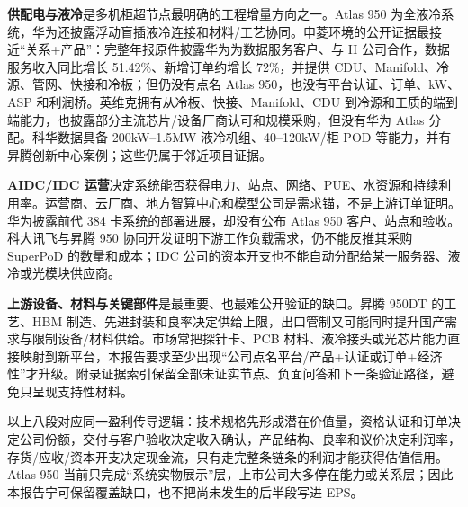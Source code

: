 \textbf{供配电与液冷}是多机柜超节点最明确的工程增量方向之一。Atlas 950 为全液冷系统，华为还披露浮动盲插液冷连接和材料/工艺协同。申菱环境的公开证据最接近“关系+产品”：完整年报原件披露华为为数据服务客户、与 H 公司合作，数据服务收入同比增长 51.42\%、新增订单约增长 72\%，并提供 CDU、Manifold、冷源、管网、快接和冷板；但仍没有点名 Atlas 950，也没有平台认证、订单、kW、ASP 和利润桥。英维克拥有从冷板、快接、Manifold、CDU 到冷源和工质的端到端能力，也披露部分主流芯片/设备厂商认可和规模采购，但没有华为 Atlas 分配。科华数据具备 200kW--1.5MW 液冷机组、40--120kW/柜 POD 等能力，并有昇腾创新中心案例；这些仍属于邻近项目证据。

\textbf{AIDC/IDC 运营}决定系统能否获得电力、站点、网络、PUE、水资源和持续利用率。运营商、云厂商、地方智算中心和模型公司是需求锚，不是上游订单证明。华为披露前代 384 卡系统的部署进展，却没有公布 Atlas 950 客户、站点和验收。科大讯飞与昇腾 950 协同开发证明下游工作负载需求，仍不能反推其采购 SuperPoD 的数量和成本；IDC 公司的资本开支也不能自动分配给某一服务器、液冷或光模块供应商。

\textbf{上游设备、材料与关键部件}是最重要、也最难公开验证的缺口。昇腾 950DT 的工艺、HBM 制造、先进封装和良率决定供给上限，出口管制又可能同时提升国产需求与限制设备/材料供给。市场常把探针卡、PCB 材料、液冷接头或光芯片能力直接映射到新平台，本报告要求至少出现“公司点名平台/产品+认证或订单+经济性”才升级。附录证据索引保留全部未证实节点、负面问答和下一条验证路径，避免只呈现支持性材料。

以上八段对应同一盈利传导逻辑：技术规格先形成潜在价值量，资格认证和订单决定公司份额，交付与客户验收决定收入确认，产品结构、良率和议价决定利润率，存货/应收/资本开支决定现金流，只有走完整条链条的利润才能获得估值信用。Atlas 950 当前只完成“系统实物展示”层，上市公司大多停在能力或关系层；因此本报告宁可保留覆盖缺口，也不把尚未发生的后半段写进 EPS。

